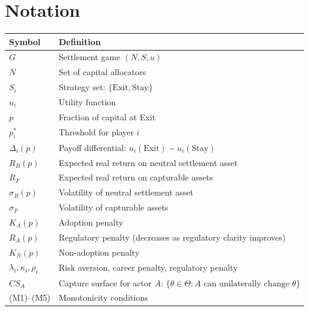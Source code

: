 \documentclass[12pt]{article}
\theoremstyle{definition}
\theoremstyle{remark}
\begin{document}

\appendix

\section{Notation}

\begin{table}[h]
\centering
\begin{tabularx}{\textwidth}{lX}
\toprule
Symbol & Definition \\
\midrule
$G$ & Settlement game $(N, S, u)$ \\
$N$ & Set of capital allocators \\
$S_i$ & Strategy set: $\{\text{Exit}, \text{Stay}\}$ \\
$u_i$ & Utility function \\
$p$ & Fraction of capital at Exit \\
$p_i^*$ & Threshold for player $i$ \\
$\Delta_i(p)$ & Payoff differential: $u_i(\text{Exit}) - u_i(\text{Stay})$ \\
$R_B(p)$ & Expected real return on neutral settlement asset \\
$R_F$ & Expected real return on capturable assets \\
$\sigma_B(p)$ & Volatility of neutral settlement asset \\
$\sigma_F$ & Volatility of capturable assets \\
$K_A(p)$ & Adoption penalty \\
$R_A(p)$ & Regulatory penalty (decreases as regulatory clarity improves) \\
$K_N(p)$ & Non-adoption penalty \\
$\lambda_i, \kappa_i, \rho_i$ & Risk aversion, career penalty, regulatory penalty \\
$CS_A$ & Capture surface for actor $A$: $\{\theta \in \Theta : A \text{ can unilaterally change } \theta\}$ \\
(M1)--(M5) & Monotonicity conditions \\
\bottomrule
\end{tabularx}
\end{table}
\end{document}
